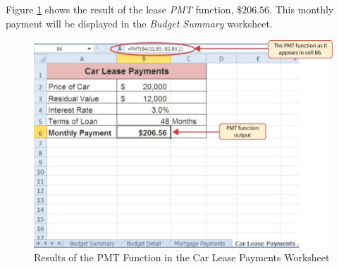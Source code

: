 Figure \ref{02:fig35} shows the result of the lease \textit{PMT} function, $ \$206.56 $. This monthly payment will be displayed in the \textit{Budget Summary} worksheet.

\begin{figure}[H]
	\centering
	\includegraphics[width=\maxwidth{.95\linewidth}]{gfx/ch02_fig35}
	\caption{Results of the PMT Function in the Car Lease Payments Worksheet}
	\label{02:fig35}
\end{figure}

